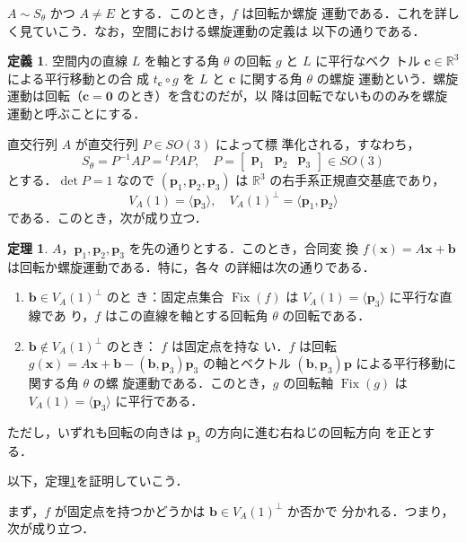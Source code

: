 \documentclass[11pt, uplatex, dvipdfmx, titlepage]{jsarticle}
\DeclareMathOperator{\Fix}{Fix}
\theoremstyle{definition}
\newtheorem{theorem}{定理}[section]
\newtheorem*{definition}{定義}
\begin{document}
$A \sim S_{\theta}$ かつ $A \neq E$ とする．このとき，$f$ は回転か螺旋
運動である．これを詳しく見ていこう．なお，空間における螺旋運動の定義は
以下の通りである．

\begin{definition}
  空間内の直線 $L$ を軸とする角 $\theta$ の回転 $g$ と $L$ に平行なベク
  トル $\bm{c} \in \mathbb{R}^3$ による平行移動との合
  成 $t_{\bm{c}}\circ g$ を $L$ と $\bm{c}$ に関する角 $\theta$ の螺旋
  運動という．螺旋運動は回転（$\bm{c}=\bm{0}$ のとき）を含むのだが，以
  降は回転でないもののみを螺旋運動と呼ぶことにする．
\end{definition}


直交行列 $A$ が直交行列 $P \in SO(3)$ によって標
準化される，すなわち，
\[
  S_{\theta} = P^{-1}AP = {}^{t}P A P, \quad P=\left[
    \begin{array}{ccc}
      \bm{p}_1 & \bm{p}_2 & \bm{p}_3
    \end{array}
  \right] \in SO(3)
\]
とする．$\det P=1$ なので $\left( \bm{p}_1, \bm{p}_2, \bm{p}_3\right)$
は $\mathbb{R}^3$ の右手系正規直交基底であり，
\[
  V_A(1)= \langle \bm{p}_3 \rangle, \quad V_A(1)^{\perp} = \langle \bm{p}_1, \bm{p}_2 \rangle
\]
である．このとき，次が成り立つ．

\begin{theorem}\label{thm:RotOrSpiral3}
  $A，\bm{p}_1, \bm{p}_2, \bm{p}_3$ を先の通りとする．このとき，合同変
  換 $f(\bm{x}) = A\bm{x} + \bm{b}$ は回転か螺旋運動である．特に，各々
  の詳細は次の通りである．
  \begin{enumerate}[(1)]
  \item $\bm{b} \in V_A(1)^{\perp}$ のと
    き：固定点集合 $\Fix(f)$ は $V_A(1)=\langle \bm{p}_3\rangle$ に平行な直線であ
    り，$f$ はこの直線を軸とする回転角 $\theta$ の回転である．
    
  \item $\bm{b} \not\in V_A(1)^{\perp}$ のとき： $f$ は固定点を持な
    い．$f$ は回転 $g(\bm{x}) = A\bm{x} +
    \bm{b}-(\bm{b},\bm{p}_3)\bm{p}_3$ の軸とベクトル
    $(\bm{b}, \bm{p}_3)\bm{p}$ による平行移動に関する角 $\theta$ の螺
    旋運動である．このとき，$g$ の回転軸 $\Fix(g)$ は $V_A(1)=\langle
    \bm{p}_3 \rangle$ に平行である．
  \end{enumerate}
  ただし，いずれも回転の向きは $\bm{p}_3$ の方向に進む右ねじの回転方向
  を正とする．
\end{theorem}

以下，定理\ref{thm:RotOrSpiral3}を証明していこう．

まず，$f$ が固定点を持つかどうかは $\bm{b} \in V_A(1)^{\perp}$ か否かで
分かれる．つまり，次が成り立つ．
\end{document}
